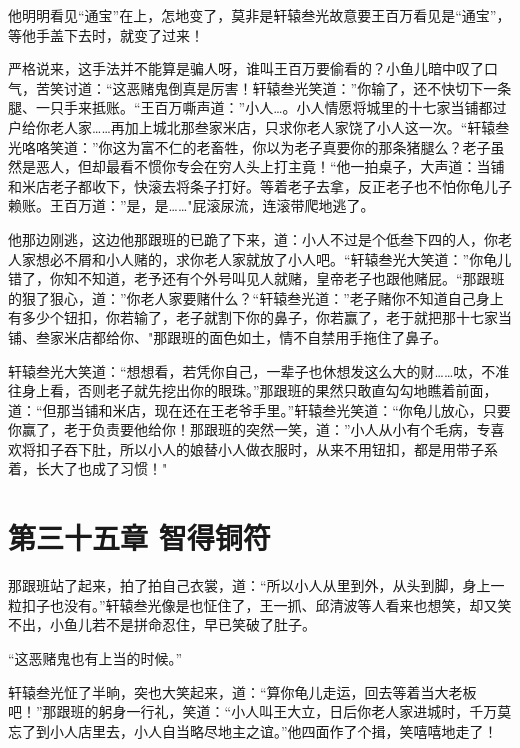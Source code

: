 \documentclass[12pt,oneside]{book}
\begin{document}
他明明看见``通宝''在上，怎地变了，莫非是轩辕叁光故意要王百万看见是``通宝''，等他手盖下去时，就变了过来！

严格说来，这手法并不能算是骗人呀，谁叫王百万要偷看的？小鱼儿暗中叹了口气，苦笑讨道：``这恶赌鬼倒真是厉害！轩辕叁光笑道：''你输了，还不快切下一条腿、一只手来抵账。``王百万嘶声道：''小人\ldots。小人情愿将城里的十七家当铺都过户给你老人家\ldots\ldots 再加上城北那叁家米店，只求你老人家饶了小人这一次。``轩辕叁光咯咯笑道：''你这为富不仁的老畜牲，你以为老子真要你的那条猪腿么？老子虽然是恶人，但却最看不惯你专会在穷人头上打主竟！``他一拍桌子，大声道：当铺和米店老子都收下，快滚去将条子打好。等着老子去拿，反正老子也不怕你龟儿子赖账。王百万道：''是，是\ldots\ldots"屁滚尿流，连滚带爬地逃了。

他那边刚逃，这边他那跟班的已跪了下来，道：小人不过是个低叁下四的人，你老人家想必不屑和小人赌的，求你老人家就放了小人吧。``轩辕叁光大笑道：''你龟儿错了，你知不知道，老予还有个外号叫见人就赌，皇帝老子也跟他赌屁。``那跟班的狠了狠心，道：''你老人家要赌什么？``轩辕叁光道：''老子赌你不知道自己身上有多少个钮扣，你若输了，老子就割下你的鼻子，你若赢了，老于就把那十七家当铺、叁家米店都给你、"那跟班的面色如土，情不自禁用手拖住了鼻子。

轩辕叁光大笑道：``想想看，若凭你自己，一辈子也休想发这么大的财\ldots\ldots 呔，不准往身上看，否则老子就先挖出你的眼珠。''那跟班的果然只敢直勾勾地瞧着前面，道：``但那当铺和米店，现在还在王老爷手里。''轩辕叁光笑道：``你龟儿放心，只要你赢了，老于负责要他给你！那跟班的突然一笑，道：''小人从小有个毛病，专喜欢将扣子吞下肚，所以小人的娘替小人做衣服时，从来不用钮扣，都是用带子系着，长大了也成了习惯！"

\hypertarget{ux7b2cux4e09ux5341ux4e94ux7ae0-ux667aux5f97ux94dcux7b26}{%
\chapter{第三十五章
智得铜符}\label{ux7b2cux4e09ux5341ux4e94ux7ae0-ux667aux5f97ux94dcux7b26}}

那跟班站了起来，拍了拍自己衣裳，道：``所以小人从里到外，从头到脚，身上一粒扣子也没有。''轩辕叁光像是也怔住了，王一抓、邱清波等人看来也想笑，却又笑不出，小鱼儿若不是拼命忍住，早已笑破了肚子。

``这恶赌鬼也有上当的时候。''

轩辕叁光怔了半晌，突也大笑起来，道：``算你龟儿走运，回去等着当大老板吧！''那跟班的躬身一行礼，笑道：``小人叫王大立，日后你老人家进城时，千万莫忘了到小人店里去，小人自当略尽地主之谊。''他四面作了个揖，笑嘻嘻地走了！
\end{document}
